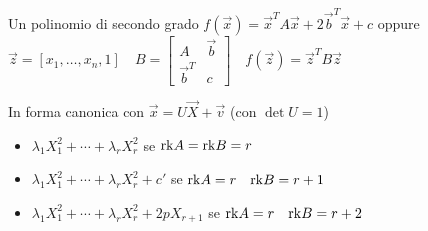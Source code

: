 Un polinomio di secondo grado
$f(\vec{x}) = \vec{x}^TA\vec{x}+2\vec{b}^T\vec{x}+c$
	oppure $\vec{z}=[x_1, \dots, x_n, 1] \quad
	B = \begin{bmatrix}A & \vec{b}\\\vec{b}^T & c\end{bmatrix} \quad
	f(\vec{z}) = \vec{z}^TB\vec{z}$

In forma canonica con $\vec{x} = U\vec{X}+\vec{v}$ (con $\det U = 1$)

\begin{itemize}
	\item $\lambda_1X_1^2 + \cdots + \lambda_rX_r^2$ se $\mathrm{rk} A = \mathrm{rk} B = r$
	\item $\lambda_1X_1^2 + \cdots + \lambda_rX_r^2 + c'$ se $\mathrm{rk} A = r \quad \mathrm{rk} B = r+1$
	\item $\lambda_1X_1^2 + \cdots + \lambda_rX_r^2 + 2pX_{r+1}$ se $\mathrm{rk} A = r \quad \mathrm{rk} B = r+2$
\end{itemize}
